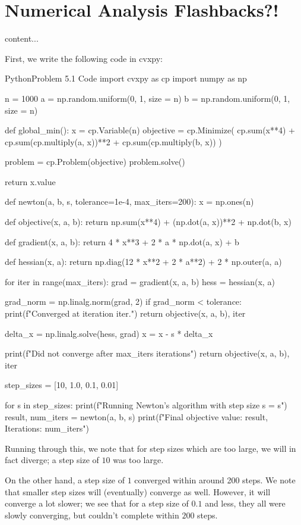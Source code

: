 \documentclass{article}
\begin{document}
\section{Numerical Analysis Flashbacks?!}
\begin{hw}{1}
	content...
\end{hw}
\begin{solution}
First, we write the following code in cvxpy:
\begin{code}{Python}{Problem 5.1 Code}
import cvxpy as cp
import numpy as np

n = 1000
a = np.random.uniform(0, 1, size = n)
b = np.random.uniform(0, 1, size = n)

def global_min():
	x = cp.Variable(n)
	objective = cp.Minimize(
		cp.sum(x**4) + cp.sum(cp.multiply(a, x))**2 + cp.sum(cp.multiply(b, x))
	)
	
	problem = cp.Problem(objective)
	problem.solve()
	
	return x.value

def newton(a, b, s, tolerance=1e-4, max_iters=200):
	x = np.ones(n)
	
	def objective(x, a, b):
		return np.sum(x**4) + (np.dot(a, x))**2 + np.dot(b, x)
	
	def gradient(x, a, b):
		return 4 * x**3 + 2 * a * np.dot(a, x) + b
	
	def hessian(x, a):
		return np.diag(12 * x**2 + 2 * a**2) + 2 * np.outer(a, a)
	
	for iter in range(max_iters):
		grad = gradient(x, a, b)
		hess = hessian(x, a)
		
		grad_norm = np.linalg.norm(grad, 2)
		if grad_norm < tolerance:
			print(f"Converged at iteration {iter}.")
			return objective(x, a, b), iter
		
		delta_x = np.linalg.solve(hess, grad)
		x = x - s * delta_x
	
	print(f"Did not converge after {max_iters} iterations")
	return objective(x, a, b), iter

step_sizes = [10, 1.0, 0.1, 0.01]

for s in step_sizes:
	print(f"Running Newton's algorithm with step size s = {s}")
	result, num_iters = newton(a, b, s)
	print(f"Final objective value: {result}, Iterations: {num_iters}")
\end{code}

Running through this, we note that for step sizes which are too large, we will in fact diverge; a step size of $10$ was too large.

On the other hand, a step size of $1$ converged within around 200 steps. We note that smaller step sizes will (eventually) converge as well. However, it will converge a lot slower; we see that for a step size of $0.1$ and less, they all were slowly converging, but couldn't complete within $200$ steps.
\end{solution}
\end{document}
